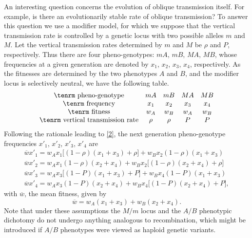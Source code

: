 \documentclass[9pt,twocolumn,twoside,lineno]{pnas-new}
\begin{document}
An interesting question concerns the evolution of oblique transmission itself. For example, is there an evolutionarily stable rate of oblique transmission? To answer this question we use a modifier model, for which we suppose that the vertical transmission rate is controlled by a genetic locus with two possible alleles $m$ and $M$. Let the vertical transmission rates determined by $m$ and $M$ be $\rho$ and $P$, respectively. Thus there are four pheno-genotypes: $mA$, $mB$, $MA$, $MB$, whose frequencies at a given generation are denoted by $x_1$, $x_2$, $x_3$, $x_4$, respectively. As the fitnesses are determined by the two phenotypes $A$ and $B$, and the modifier locus is selectively neutral, we have the following table.
 \begin{equation}
 \begin{array}{ccccc}
 \hbox{\tenrm pheno-genotype}&mA&mB&MA&MB\\
 \hbox{\tenrm frequency}&x_1&x_2&x_3&x_4\\
 \hbox{\tenrm fitness}&w_A&w_B&w_A&w_B\\
 \hbox{\tenrm vertical transmission rate}&\rho&\rho&P&P
 \end{array}\label{31}\end{equation}
Following the rationale leading to \eqref{2}, the next generation pheno-genotype frequencies $x'_1$, $x'_2$, $x'_3$, $x'_4$ are
\begin{equation}
\begin{array}{l}
\overline wx'_1 = w_Ax_1\bigl[(1-\rho)(x_1+x_3) +\rho\bigr] +w_Bx_2(1-\rho)(x_1+x_3)\\
 \overline wx'_2 = w_Ax_1(1-\rho)(x_2+x_4) +w_Bx_2\bigl[(1-\rho)(x_2+x_4)+\rho\bigr]\\ 
  \overline wx'_3 = w_Ax_3\bigl[(1-P)(x_1+x_3) +P\bigr] +w_Bx_4(1-P)(x_1+x_3)\\
\overline wx'_4 = w_Ax_3(1-P)(x_2+x_4) +w_Bx_4\bigl[(1-P)(x_2+x_4)+P\bigr], 
\end{array}\label{32}\end{equation}
with $\overline w$, the mean fitness, given by
\begin{equation}
\overline w =w_A(x_1+x_3) +w_B(x_2+x_4).
\label{33}\end{equation}
Note that under these assumptions the $M/m$ locus and the $A/B$ phenotypic dichotomy do not undergo anything analogous to recombination, which might be introduced if $A/B$ phenotypes were viewed as haploid genetic variants. 
\end{document}

